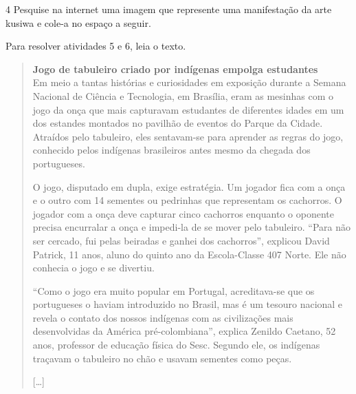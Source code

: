 

\num{4}  Pesquise na internet uma imagem que represente uma manifestação da
arte kusiwa e cole-a no espaço a seguir.




Para resolver atividades 5 e 6, leia o texto.

\begin{quote}
\textbf{Jogo de tabuleiro criado por indígenas empolga estudantes}\\
Em meio a tantas histórias e curiosidades em exposição durante a Semana
Nacional de Ciência e Tecnologia, em Brasília, eram as mesinhas com o
jogo da onça que mais capturavam estudantes de diferentes idades em um
dos estandes montados no pavilhão de eventos do Parque da Cidade.
Atraídos pelo tabuleiro, eles sentavam-se para aprender as regras do
jogo, conhecido pelos indígenas brasileiros antes mesmo da chegada dos
portugueses.

O jogo, disputado em dupla, exige estratégia. Um jogador fica com a onça
e o outro com 14 sementes ou pedrinhas que representam os cachorros. O
jogador com a onça deve capturar cinco cachorros enquanto o oponente
precisa encurralar a onça e impedi-la de se mover pelo tabuleiro. “Para
não ser cercado, fui pelas beiradas e ganhei dos cachorros”, explicou
David Patrick, 11 anos, aluno do quinto ano da Escola-Classe 407 Norte.
Ele não conhecia o jogo e se divertiu.

“Como o jogo era muito popular em Portugal, acreditava-se que os
portugueses o haviam introduzido no Brasil, mas é um tesouro nacional e
revela o contato dos nossos indígenas com as civilizações mais
desenvolvidas da América pré-colombiana”, explica Zenildo Caetano, 52
anos, professor de educação física do Sesc. Segundo ele, os indígenas
traçavam o tabuleiro no chão e usavam sementes como peças.

{[}\ldots{}{]}

\end{quote}

